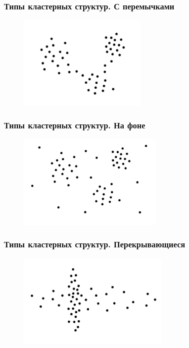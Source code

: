 \documentclass[12pt]{beamer}
\begin{document}
\begin{frame}\frametitle{Типы кластерных структур. С перемычками}
\begin{figure}[htbp]
  \includegraphics[height=130pt, keepaspectratio = true]{images/cluster4}  
\end{figure}
\end{frame}

\begin{frame}\frametitle{Типы кластерных структур. На фоне}
\begin{figure}[htbp]
  \includegraphics[height=130pt, keepaspectratio = true]{images/cluster5}  
\end{figure}
\end{frame}

\begin{frame}\frametitle{Типы кластерных структур. Перекрывающиеся}
\begin{figure}[htbp]
  \includegraphics[height=130pt, keepaspectratio = true]{images/cluster6}  
\end{figure}
\end{frame}
\end{document}
